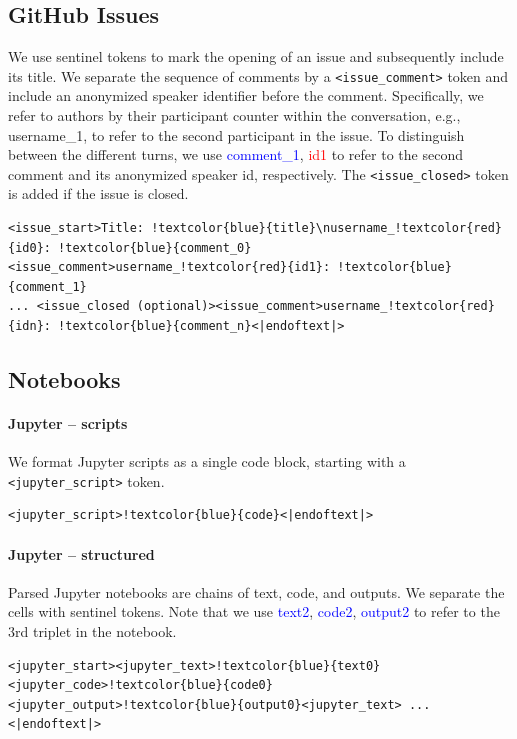 \documentclass[10pt]{article} %
\begin{document}
\subsection{GitHub Issues}
\label{sec:issues}

We use sentinel tokens to mark the opening of an issue and subsequently include its title. We separate the sequence of comments by a \verb|<issue_comment>| token and include an anonymized speaker identifier before the comment. Specifically, we refer to authors by their participant counter within the conversation, e.g., username\_1, to refer to the second participant in the issue. To distinguish between the different turns, we use \textcolor{blue}{comment\_1}, \textcolor{red}{id1} to refer to the second comment and its anonymized speaker id, respectively. The \verb|<issue_closed>| token is added if the issue is closed.

\begin{Verbatim}[commandchars=!\{\}]
<issue_start>Title: !textcolor{blue}{title}\nusername_!textcolor{red}{id0}: !textcolor{blue}{comment_0}<issue_comment>username_!textcolor{red}{id1}: !textcolor{blue}{comment_1}
... <issue_closed (optional)><issue_comment>username_!textcolor{red}{idn}: !textcolor{blue}{comment_n}<|endoftext|>
\end{Verbatim}

\subsection{Notebooks}
\paragraph{Jupyter -- scripts} We format Jupyter scripts as a single code block, starting with a \verb|<jupyter_script>| token.
\begin{Verbatim}[commandchars=!\{\}]
<jupyter_script>!textcolor{blue}{code}<|endoftext|> 
\end{Verbatim}


\paragraph{Jupyter -- structured} Parsed Jupyter notebooks are chains of text, code, and outputs. We separate the cells with sentinel tokens. Note that we use \textcolor{blue}{text2}, \textcolor{blue}{code2}, \textcolor{blue}{output2} to refer to the 3rd triplet in the notebook.  

\begin{Verbatim}[commandchars=!\{\}]
<jupyter_start><jupyter_text>!textcolor{blue}{text0}<jupyter_code>!textcolor{blue}{code0}
<jupyter_output>!textcolor{blue}{output0}<jupyter_text> ... <|endoftext|> 
\end{Verbatim}
\end{document}
